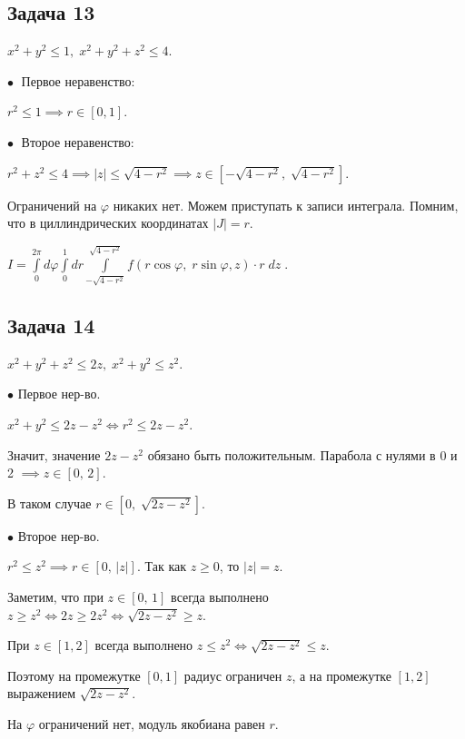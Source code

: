 \documentclass[a4paper, fleqn]{article}
\begin{document}
    \subsection*{Задача 13}
    
    $x^2 + y^2 \leq 1, \; x^2 + y^2 + z^2 \leq 4.$
    
    $\bullet \; $ Первое неравенство:
    
    $r^2 \leq 1 \implies r \in [0,1].$
    
    $\bullet \; $ Второе неравенство:
    
    $r^2 + z^2 \leq 4 \implies |z| \leq \sqrt{4 - r^2} \implies z \in [-\sqrt{4 - r^2}, \; \sqrt{4 - r^2}].$
    
    Ограничений на  $\varphi$ никаких нет. Можем приступать к записи интеграла. Помним, что в циллиндрических координатах $|J| = r.$
    
    $I = \boxed{\displaystyle \int\limits_{0}^{2 \pi} d \varphi \int\limits_{0}^{1} dr \int\limits_{-\sqrt{4 - r^2}}^{\sqrt{4 - r^2}} f(r \cos \varphi, \; r \sin \varphi, z) \cdot r \; dz} \; .$
    
     
    \subsection*{Задача 14}
    
    $x^2 + y^2 + z^2 \leq  2z, \; x^2 + y^2 \leq z^2.$
    
    $\bullet$ Первое нер-во.
    
    $x^2 + y^2 \leq 2z - z^2 \iff r^2 \leq 2z-z^2.$ 
    
    Значит, значение $2z - z^2$ обязано быть положительным. Парабола с нулями в 0 и 2 $\implies z \in [0, \, 2].$
    
    В таком случае $r \in \left[0, \; \sqrt{2z - z^2} \right].$
    
    $\bullet$ Второе нер-во.
    
    $r^2 \leq z^2 \implies r \in \left[0, \, |z|\right].$ Так как $z \geq 0$, то $|z| = z.$ 
    
    Заметим, что при $z \in [0, \, 1]$ всегда выполнено $z \geq z^2 \iff 2z \geq 2z^2 \iff \sqrt{2z - z^2} \geq z .$
    
    При $z \in [1, 2]$ всегда выполнено $z \leq z^2 \iff \sqrt{2z - z^2} \leq z.$
    
    Поэтому на промежутке $[0,1]$ радиус ограничен $z$, а на промежутке $[1,2]$ выражением $\sqrt{2z - z^2}$.
    
    На $\varphi$ ограничений нет, модуль якобиана равен $r$.
    
\end{document}
